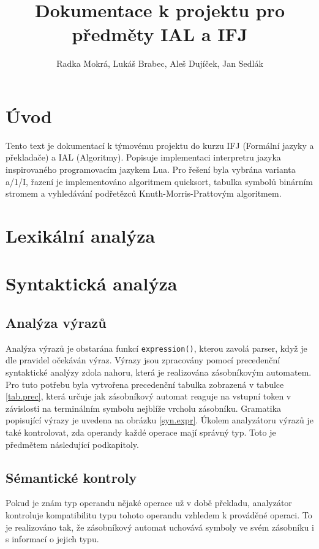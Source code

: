 \documentclass[a4paper,11pt,titlepage]{article}
\author{Radka Mokrá, Lukáš Brabec, Aleš Dujíček, Jan Sedlák}
\title{Dokumentace k projektu pro předměty IAL a IFJ}
\begin{document}


\tableofcontents

\newpage

\section{Úvod}
Tento text je dokumentací k týmovému projektu do kurzu IFJ (Formální jazyky a překladače) a IAL (Algoritmy). Popisuje implementaci interpretru jazyka inspirovaného programovacím jazykem Lua. Pro řešení byla vybrána varianta a/1/I, řazení je implementováno algoritmem quicksort, tabulka symbolů binárním stromem a vyhledávání podřetězců Knuth-Morris-Prat\-to\-vým algoritmem.

\section{Lexikální analýza}


\section{Syntaktická analýza}



\subsection{Analýza výrazů}
Analýza výrazů je obstarána funkcí {\tt expression()}, kterou zavolá parser, když je dle pravidel očekáván výraz. Výrazy jsou zpracovány pomocí precedenční syntaktické analýzy zdola nahoru, která je realizována zásobníkovým automatem. Pro tuto potřebu byla vytvořena precedenční tabulka zobrazená v tabulce \ref{tab.prec}, která určuje jak zásobníkový automat reaguje na vstupní token v závislosti na terminálním symbolu nejblíže vrcholu zásobníku. Gramatika popisující výrazy je uvedena na obrázku \ref{syn.expr}.
Úkolem analyzátoru výrazů je také kontrolovat, zda operandy každé operace mají správný typ. Toto je předmětem následující podkapitoly.





\subsection{Sémantické kontroly}
Pokud je znám typ operandu nějaké operace už v době překladu, analyzátor kontroluje kompatibilitu typu tohoto operandu vzhledem k prováděné operaci. To je realizováno tak, že zásobníkový automat uchovává symboly ve svém zásobníku i s informací o jejich typu.
\end{document}
